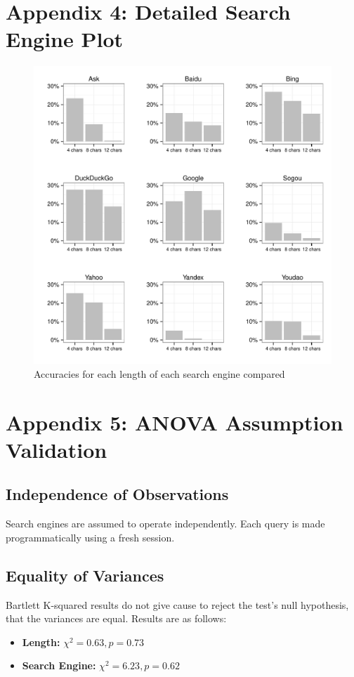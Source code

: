 \documentclass{csfourzero}
\begin{document}
\pagebreak
\section{Appendix 4: Detailed Search Engine Plot}
\begin{figure}[H]
  \centerline{\includegraphics[width=\textwidth]{eng_vs_acc_9_way}}
  \caption{Accuracies for each length of each search engine compared}\label{fig:9searchengines}
\end{figure}

\pagebreak
\section{Appendix 5: ANOVA Assumption Validation}
\subsection{Independence of Observations}
Search engines are assumed to operate independently. Each query is made programmatically using a fresh session.

\subsection{Equality of Variances}
Bartlett K-squared results do not give cause to reject the test's null hypothesis, that the variances are equal. Results are as follows:
\begin{itemize}
  \item{\textbf{Length:} $\chi^2 = 0.63, p = 0.73 $}
  \item{\textbf{Search Engine:} $\chi^2 = 6.23, p = 0.62 $}
\end{itemize}
\end{document}
